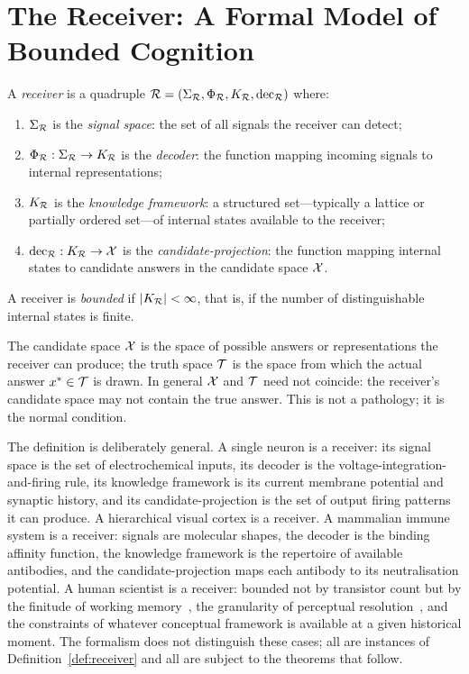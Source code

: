 \section{The Receiver: A Formal Model of Bounded Cognition}
\label{sec:receiver}

\begin{definition}[Receiver]\label{def:receiver}
A \emph{receiver} is a quadruple $\mathcal{R} = (\Sigma_{\mathcal{R}}, \Phi_{\mathcal{R}}, K_{\mathcal{R}}, \mathrm{dec}_{\mathcal{R}})$ where:
\begin{enumerate}[nosep, label=(\roman*)]
  \item $\Sigma_{\mathcal{R}}$ is the \emph{signal space}: the set of all signals the receiver can detect;
  \item $\Phi_{\mathcal{R}} : \Sigma_{\mathcal{R}} \to K_{\mathcal{R}}$ is the \emph{decoder}: the function mapping incoming signals to internal representations;
  \item $K_{\mathcal{R}}$ is the \emph{knowledge framework}: a structured set---typically a lattice or partially ordered set---of internal states available to the receiver;
  \item $\mathrm{dec}_{\mathcal{R}} : K_{\mathcal{R}} \to \mathcal{X}$ is the \emph{candidate-projection}: the function mapping internal states to candidate answers in the candidate space $\mathcal{X}$.
\end{enumerate}
A receiver is \emph{bounded} if $|K_{\mathcal{R}}| < \infty$, that is, if the number of distinguishable internal states is finite.
\end{definition}

The candidate space $\mathcal{X}$ is the space of possible answers or representations the receiver can produce; the truth space $\mathcal{T}$ is the space from which the actual answer $x^* \in \mathcal{T}$ is drawn. In general $\mathcal{X}$ and $\mathcal{T}$ need not coincide: the receiver's candidate space may not contain the true answer. This is not a pathology; it is the normal condition.

The definition is deliberately general. A single neuron is a receiver: its signal space is the set of electrochemical inputs, its decoder is the voltage-integration-and-firing rule, its knowledge framework is its current membrane potential and synaptic history, and its candidate-projection is the set of output firing patterns it can produce. A hierarchical visual cortex is a receiver. A mammalian immune system is a receiver: signals are molecular shapes, the decoder is the binding affinity function, the knowledge framework is the repertoire of available antibodies, and the candidate-projection maps each antibody to its neutralisation potential. A human scientist is a receiver: bounded not by transistor count but by the finitude of working memory~\citep{lisman1995}, the granularity of perceptual resolution~\citep{sperling1960}, and the constraints of whatever conceptual framework is available at a given historical moment. The formalism does not distinguish these cases; all are instances of Definition~\ref{def:receiver} and all are subject to the theorems that follow.

